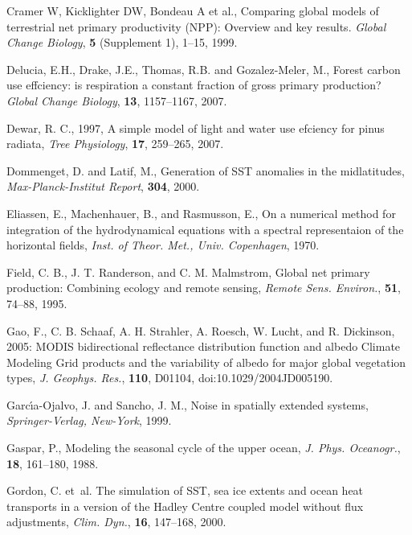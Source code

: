 \begin{thebibliography}{}
 Cramer W, Kicklighter DW, Bondeau A et al., Comparing global models of
 terrestrial net primary productivity (NPP): Overview and key results.
 {\it Global Change Biology}, {\bf 5} (Supplement 1), 1--15, 1999.

Delucia, E.H., Drake,
 J.E., Thomas, R.B. and Gozalez-Meler, M., Forest carbon use effciency:
 is respiration a constant  fraction of gross primary production?
 {\it Global Change Biology}, {\bf 13}, 1157--1167, 2007. 

 Dewar, R. C., 1997, A simple model of light and water use efciency for pinus
 radiata, {\it Tree Physiology}, {\bf 17}, 259--265, 2007. 

 Dommenget, D. and Latif, M.,
 Generation of SST anomalies in the midlatitudes,
 {\em Max-Planck-Institut Report}, {\bf 304}, 2000.

 Eliassen, E., Machenhauer, B., and Rasmusson, E.,
 On a numerical method for integration of the hydrodynamical
 equations with a spectral representaion of the horizontal fields,
 {\em Inst. of Theor. Met., Univ. Copenhagen}, 1970.

 Field, C. B., J. T. Randerson, and C. M. Malmstrom,
 Global net primary production: Combining ecology and remote sensing,
 {\it Remote Sens. Environ.}, {\bf 51}, 74--88, 1995.

 Gao, F., C. B. Schaaf, A. H. Strahler, A. Roesch, W. Lucht,
 and R. Dickinson, 2005: MODIS bidirectional reflectance distribution
 function and albedo Climate Modeling Grid products and the variability
 of albedo for major global vegetation types, {\it J. Geophys. Res.},
 {\bf 110}, D01104, doi:10.1029/2004JD005190.

 Garc\'{\i}a-Ojalvo, J. and  Sancho, J. M.,
 Noise in spatially extended systems,
 {\em Springer-Verlag, New-York}, 1999.

 Gaspar, P.,
 Modeling the seasonal cycle of the upper ocean,
 {\em J. Phys. Oceanogr.}, {\bf 18}, 161--180, 1988.

 Gordon, C. et~al.
 The simulation of SST, sea ice extents and ocean heat transports
 in a version of the Hadley Centre coupled model without flux adjustments,
 {\em Clim. Dyn.}, {\bf 16}, 147--168, 2000.


\end{thebibliography}
